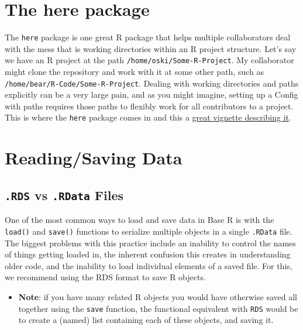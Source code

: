 \documentclass[
]{book}
\providecommand{\tightlist}{%
  \setlength{\itemsep}{0pt}\setlength{\parskip}{0pt}}
\begin{document}
\hypertarget{the-here-package}{%
\section{The here package}\label{the-here-package}}

The \texttt{here} package is one great R package that helps multiple collaborators deal with the mess that is working directories within an R project structure. Let's say we have an R project at the path \texttt{/home/oski/Some-R-Project}. My collaborator might clone the repository and work with it at some other path, such as \texttt{/home/bear/R-Code/Some-R-Project}. Dealing with working directories and paths explicitly can be a very large pain, and as you might imagine, setting up a Config with paths requires those paths to flexibly work for all contributors to a project. This is where the \texttt{here} package comes in and this a \href{https://github.com/jennybc/here_here}{great vignette describing it}.

\hypertarget{readingsaving-data}{%
\section{Reading/Saving Data}\label{readingsaving-data}}

\hypertarget{rds-vs-.rdata-files}{%
\subsection{\texorpdfstring{\texttt{.RDS} vs \texttt{.RData} Files}{.RDS vs .RData Files}}\label{rds-vs-.rdata-files}}

One of the most common ways to load and save data in Base R is with the \texttt{load()} and \texttt{save()} functions to serialize multiple objects in a single \texttt{.RData} file. The biggest problems with this practice include an inability to control the names of things getting loaded in, the inherent confusion this creates in understanding older code, and the inability to load individual elements of a saved file. For this, we recommend using the RDS format to save R objects.

\begin{itemize}
\tightlist
\item
  \textbf{Note}: if you have many related R objects you would have otherwise saved all together using the \texttt{save} function, the functional equivalent with \texttt{RDS} would be to create a (named) list containing each of these objects, and saving it.
\end{itemize}
\end{document}
